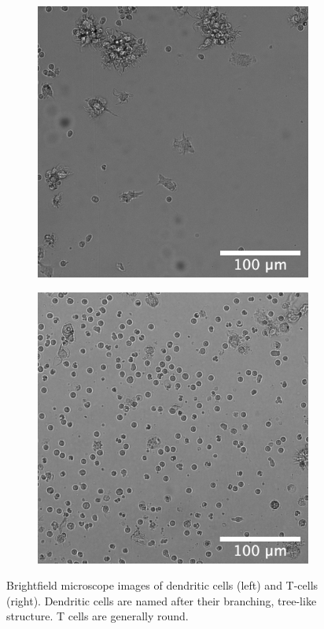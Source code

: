 \begin{figure}[h]
    \centering
    \begin{subfigure}[h!]{0.3\textwidth}
        \includegraphics[width=\textwidth]{dissertation/figures/example_DCs_CK19O21.png}
    \end{subfigure}
    \begin{subfigure}[h!]{0.3\textwidth}
        \includegraphics[width=\textwidth]{dissertation/figures/example_Tcells_CK22B12.png}
    \end{subfigure}
    \caption{Brightfield microscope images of dendritic cells (left) and T-cells (right). Dendritic cells are named after their branching, tree-like structure. T cells are generally round.}
    \label{fig:real_cells}
\end{figure}

